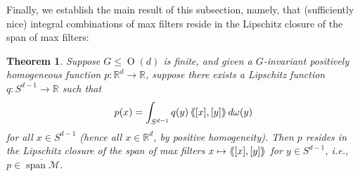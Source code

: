 \documentclass{article}
\theoremstyle{plain}
\newtheorem{theorem}{Theorem}
\theoremstyle{definition}
\newcommand{\llangle}{\langle\hspace{-2.5pt}\langle}
\newcommand{\rrangle}{\rangle\hspace{-2.5pt}\rangle}
\begin{document}
Finally, we establish the main result of this subsection, namely, that (sufficiently nice) integral combinations of max filters reside in the Lipschitz closure of the span of max filters:

\begin{theorem}
\label{thm.integral combos are in lipschitz closure of linear of max filter}
Suppose $G\leq\operatorname{O}(d)$ is finite, and given a $G$-invariant positively homogeneous function $p\colon \mathbb{R}^d\to\mathbb{R}$, suppose there exists a Lipschitz function $q\colon S^{d-1}\to\mathbb{R}$ such that
\begin{equation}
\label{eq.p as an integral combination of max filters}
p(x)
=\int_{S^{d-1}}q(y)\,\llangle[x],[y]\rrangle\,d\omega(y)
\end{equation}
for all $x\in S^{d-1}$ (hence all $x \in \mathbb{R}^d$, by positive homogeneity).
Then $p$ resides in the Lipschitz closure of the span of max filters $x \mapsto \llangle [x],[y] \rrangle$ for $y \in S^{d-1}$, i.e., $p\in\overline{\operatorname{span}\mathcal{M}}$.
\end{theorem}
\end{document}
